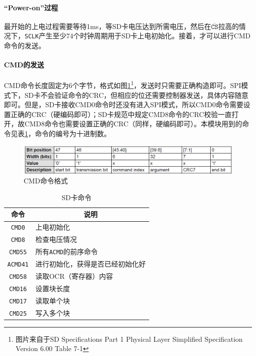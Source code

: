 \documentclass[11pt,utf8]{report}
\begin{document}
	\paragraph{“Power-on”过程} 最开始的上电过程需要等待1ms，等SD卡电压达到所需电压，然后在$\mathtt{\overline{CS}}$拉高的情况下，\texttt{SCLK}产生至少74个时钟周期用于SD卡上电初始化。接着，才可以进行CMD命令的发送。

	\paragraph{CMD的发送} CMD命令长度固定为6个字节，格式如图\ref{cmd}\footnote{图片来自于SD Specifications Part 1 Physical Layer Simplified Specification Version 6.00 Table 7-1}，发送时只需要正确构造即可。SPI模式下，SD卡不会验证命令的CRC，但相应的位还需要控制器发送，具体内容随意即可。但是，SD卡接收CMD0命令时还没有进入SPI模式，所以CMD0命令需要设置正确的CRC（硬编码即可）；SD卡规范中规定CMD8命令的CRC校验一直打开，故CMD8命令也需要设置正确的CRC（同样，硬编码即可）。本模块用到的命令见表\ref{cmds}，命令的编号为十进制数。
	
	\begin{figure}[h!]
		\centering
		\includegraphics[width=\textwidth]{cmd}
		\caption{CMD命令格式}
		\label{cmd}
	\end{figure}
	
	\begin{table}[h]
	\centering
	\begin{tabular}{c|l}
	\toprule[1.2pt]
	\multicolumn{1}{c|}{\textbf{命令}} & \multicolumn{1}{c}{\textbf{说明}} \\
	\midrule[1.2pt]
	\texttt{CMD0} & 上电初始化 \\ \hline
	\texttt{CMD8} & 检查电压情况 \\ \hline
	\texttt{CMD55} & 所有\texttt{ACMD}的前序命令 \\ \hline
	\texttt{ACMD41} & 进行初始化，获得是否已经初始化好 \\ \hline
	\texttt{CMD58} & 读取OCR（寄存器）内容 \\ \hline
	\texttt{CMD16} & 设置块长度 \\ \hline
	\texttt{CMD17} & 读取单个块 \\ \hline
	\texttt{CMD25} & 写入多个块 \\
	\bottomrule[1.2pt]
	\end{tabular}
	\caption{SD卡命令}
	\label{cmds}
	\end{table}
	
\end{document}
